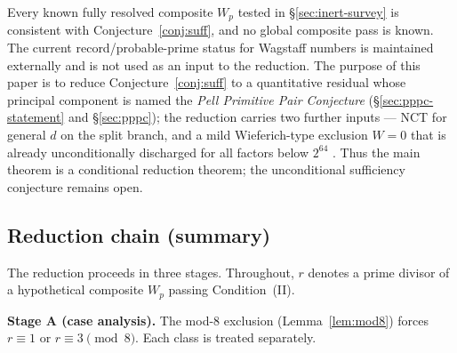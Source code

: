 \documentclass[11pt]{amsart}
\theoremstyle{plain}
\theoremstyle{definition}
\theoremstyle{remark}
\numberwithin{equation}{section}
\begin{document}
Every known fully resolved composite $W_p$ tested in \S\ref{sec:inert-survey} is consistent with Conjecture~\ref{conj:suff}, and no global composite pass is known. The current record/probable-prime status for Wagstaff numbers is maintained externally \cite{ref:PrimePagesWagstaff} and is not used as an input to the reduction. The purpose of this paper is to reduce Conjecture~\ref{conj:suff} to a quantitative residual whose principal component is named the \emph{Pell Primitive Pair Conjecture} (\S\ref{sec:pppc-statement} and \S\ref{sec:pppc}); the reduction carries two further inputs --- NCT for general $d$ on the split branch, and a mild Wieferich-type exclusion $W = 0$ that is already unconditionally discharged for all factors below $2^{64}$ \cite{ref:OEISWieferich}. Thus the main theorem is a conditional reduction theorem; the unconditional sufficiency conjecture remains open.

\subsection{Reduction chain (summary)}\label{sec:reduction-chain}

The reduction proceeds in three stages. Throughout, $r$ denotes a prime divisor of a hypothetical composite $W_p$ passing Condition~(II).

\textbf{Stage A (case analysis).} The mod-8 exclusion (Lemma~\ref{lem:mod8}) forces $r \equiv 1$ or $r \equiv 3 \pmod 8$. Each class is treated separately.
\end{document}
